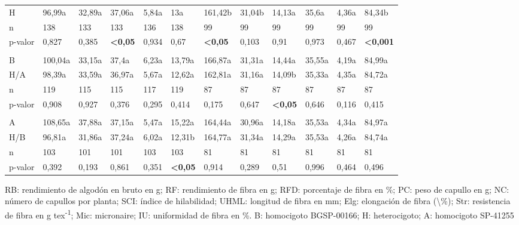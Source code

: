 \documentclass[12pt,oneside]{reedthesis}
\begin{document}
\begin{table}[!h]
{\begin{threeparttable}
\begin{tabular}[t]{llllllllllll}
\hspace{1em}H & 96,99a & 32,89a & 37,06a & 5,84a & 13a & 161,42b & 31,04b & 14,13a & 35,6a & 4,36a & 84,34b\\
\hspace{1em}n & 138 & 133 & 133 & 136 & 138 & 99 & 99 & 99 & 99 & 99 & 99\\
\hspace{1em}p-valor & 0,827 & 0,385 & \textbf{<0,05} & 0,934 & 0,67 & \textbf{<0,05} & 0,103 & 0,91 & 0,973 & 0,467 & \textbf{<0,001}\\
\addlinespace[0.3em]
\multicolumn{12}{l}{\textbf{NAU3017}}\\
\hspace{1em}B & 100,04a & 33,15a & 37,4a & 6,23a & 13,79a & 166,87a & 31,31a & 14,44a & 35,55a & 4,19a & 84,99a\\
\hspace{1em}H/A & 98,39a & 33,59a & 36,97a & 5,67a & 12,62a & 162,81a & 31,16a & 14,09b & 35,33a & 4,35a & 84,72a\\
\hspace{1em}n & 119 & 115 & 115 & 117 & 119 & 87 & 87 & 87 & 87 & 87 & 87\\
\hspace{1em}p-valor & 0,908 & 0,927 & 0,376 & 0,295 & 0,414 & 0,175 & 0,647 & \textbf{<0,05} & 0,646 & 0,116 & 0,415\\
\addlinespace[0.3em]
\multicolumn{12}{l}{\textbf{NAU3901}}\\
\hspace{1em}A & 108,65a & 37,88a & 37,15a & 5,47a & 15,22a & 164,44a & 30,96a & 14,18a & 35,53a & 4,34a & 84,97a\\
\hspace{1em}H/B & 96,81a & 31,86a & 37,24a & 6,02a & 12,31b & 164,77a & 31,34a & 14,29a & 35,53a & 4,26a & 84,74a\\
\hspace{1em}n & 103 & 101 & 101 & 103 & 103 & 81 & 81 & 81 & 81 & 81 & 81\\
\hspace{1em}p-valor & 0,392 & 0,193 & 0,861 & 0,351 & \textbf{<0,05} & 0,914 & 0,289 & 0,51 & 0,996 & 0,464 & 0,496\\
\bottomrule
\end{tabular}
\begin{tablenotes}[para]
\item RB: rendimiento de algodón en bruto en g; RF: rendimiento de fibra en g; RFD: porcentaje de fibra en \%; PC: peso de capullo en g; NC: número de capullos por planta; SCI: índice de hilabilidad; UHML: longitud de fibra en mm; Elg: elongación de fibra (\textbackslash{}\%); Str: resistencia de fibra en g tex\textsuperscript{-1}; Mic: micronaire; IU: uniformidad de fibra en \%. B: homocigoto BGSP-00166; H: heterocigoto; A: homocigoto SP-41255
\end{tablenotes}
\end{threeparttable}}
\end{table}
\end{document}

